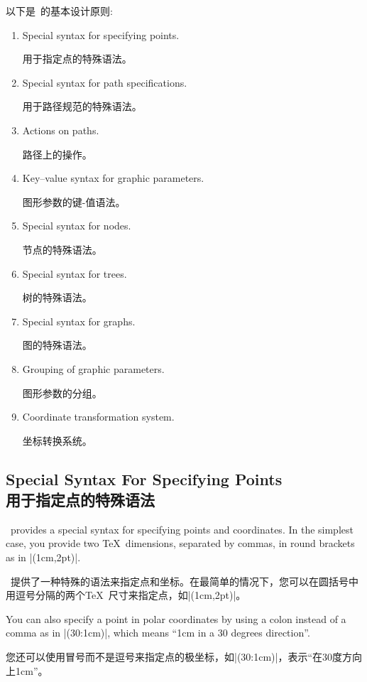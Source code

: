 以下是\tikzname\ 的基本设计原则:
%
\begin{enumerate}
    \item Special syntax for specifying points.

    用于指定点的特殊语法。
    \item Special syntax for path specifications.

    用于路径规范的特殊语法。
    \item Actions on paths.

    路径上的操作。
    \item Key--value syntax for graphic parameters.

    图形参数的键-值语法。
    \item Special syntax for nodes.

    节点的特殊语法。
    \item Special syntax for trees.

    树的特殊语法。
    \item Special syntax for graphs.

    

    图的特殊语法。
    \item Grouping of graphic parameters.

    图形参数的分组。
    \item Coordinate transformation system.

    坐标转换系统。
\end{enumerate}



\subsection{Special Syntax For Specifying Points\\用于指定点的特殊语法}

\tikzname\ provides a special syntax for specifying points and coordinates. In
the simplest case, you provide two \TeX\ dimensions, separated by commas, in
round brackets as in |(1cm,2pt)|.

\tikzname\ 提供了一种特殊的语法来指定点和坐标。在最简单的情况下，您可以在圆括号中用逗号分隔的两个\TeX\ 尺寸来指定点，如|(1cm,2pt)|。

You can also specify a point in polar coordinates by using a colon instead of a
comma as in |(30:1cm)|, which means ``1cm in a 30 degrees direction''.

您还可以使用冒号而不是逗号来指定点的极坐标，如|(30:1cm)|，表示``在30度方向上1cm''。

